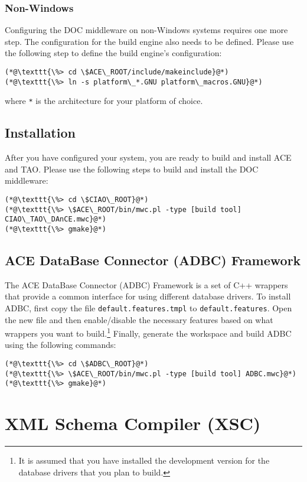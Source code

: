 \subsubsection{Non-Windows}
Configuring the DOC middleware on non-Windows systems requires one more 
step. The configuration for the build engine also needs to be defined. 
Please use the following step to define the build engine's configuration:
\begin{lstlisting}
(*@\texttt{\%> cd \$ACE\_ROOT/include/makeinclude}@*)
(*@\texttt{\%> ln -s platform\_*.GNU platform\_macros.GNU}@*)
\end{lstlisting}
where \texttt{*} is the architecture for your platform of choice.

\subsection{Installation}

After you have configured your system, you are ready to build and 
install ACE and TAO. Please use the following steps to build and 
install the DOC middleware:
\begin{lstlisting}
(*@\texttt{\%> cd \$CIAO\_ROOT}@*)
(*@\texttt{\%> \$ACE\_ROOT/bin/mwc.pl -type [build tool] CIAO\_TAO\_DAnCE.mwc}@*)
(*@\texttt{\%> gmake}@*)
\end{lstlisting}

\subsection{ACE DataBase Connector (ADBC) Framework}
\label{sec:thirdparty-adbc}

The ACE DataBase Connector (ADBC) Framework is a set of C++ wrappers 
that provide a common interface for using different database drivers.
To install ADBC, first copy the file \texttt{default.features.tmpl} to
\texttt{default.features}. Open the new file and then enable/disable
the necessary features based on what wrappers you want to 
build.\footnote{It is assumed that you have installed the development
version for the database drivers that you plan to build.} Finally,
generate the workspace and build ADBC using the following commands:
\begin{lstlisting}
(*@\texttt{\%> cd \$ADBC\_ROOT}@*)
(*@\texttt{\%> \$ACE\_ROOT/bin/mwc.pl -type [build tool] ADBC.mwc}@*)
(*@\texttt{\%> gmake}@*)
\end{lstlisting}
 
\section{XML Schema Compiler (XSC)}
\label{sec:thirdparty-xsc}

